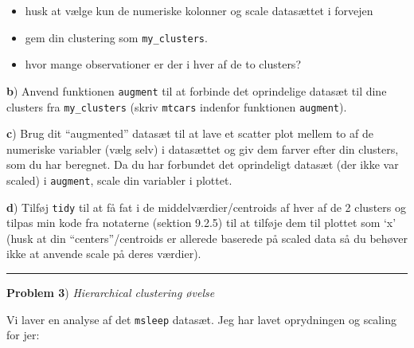 \documentclass[
]{book}
\newenvironment{Shaded}{\begin{snugshade}}{\end{snugshade}}
\newcommand{\FunctionTok}[1]{\textcolor[rgb]{0.00,0.00,0.00}{#1}}
\newcommand{\NormalTok}[1]{#1}
\newcommand{\OtherTok}[1]{\textcolor[rgb]{0.56,0.35,0.01}{#1}}
\newcommand{\SpecialCharTok}[1]{\textcolor[rgb]{0.00,0.00,0.00}{#1}}
\providecommand{\tightlist}{%
  \setlength{\itemsep}{0pt}\setlength{\parskip}{0pt}}
\begin{document}
\begin{itemize}
\tightlist
\item
  husk at vælge kun de numeriske kolonner og scale datasættet i forvejen
\item
  gem din clustering som \texttt{my\_clusters}.
\item
  hvor mange observationer er der i hver af de to clusters?
\end{itemize}

\textbf{b}) Anvend funktionen \texttt{augment} til at forbinde det oprindelige datasæt til dine clusters fra \texttt{my\_clusters} (skriv \texttt{mtcars} indenfor funktionen \texttt{augment}).

\textbf{c}) Brug dit ``augmented'' datasæt til at lave et scatter plot mellem to af de numeriske variabler (vælg selv) i datasættet og giv dem farver efter din clusters, som du har beregnet. Da du har forbundet det oprindeligt datasæt (der ikke var scaled) i \texttt{augment}, scale din variabler i plottet.

\textbf{d}) Tilføj \texttt{tidy} til at få fat i de middelværdier/centroids af hver af de 2 clusters og tilpas min kode fra notaterne (sektion 9.2.5) til at tilføje dem til plottet som `x' (husk at din ``centers''/centroids er allerede baserede på scaled data så du behøver ikke at anvende scale på deres værdier).

\begin{center}\rule{0.5\linewidth}{0.5pt}\end{center}

\textbf{Problem 3}) \emph{Hierarchical clustering øvelse}

Vi laver en analyse af det \texttt{msleep} datasæt. Jeg har lavet oprydningen og scaling for jer:

\begin{Shaded}
\end{Shaded}
\end{document}
